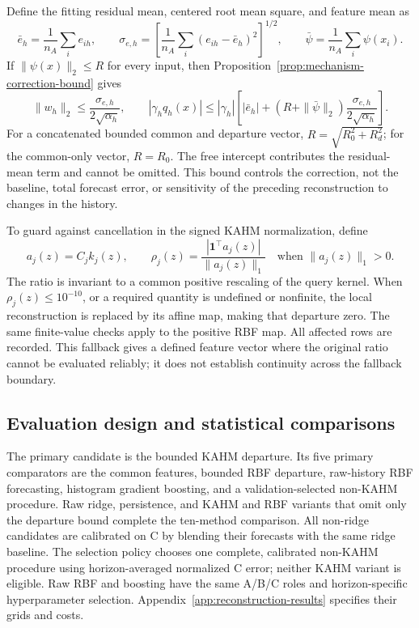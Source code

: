 Define the fitting residual mean, centered root mean square, and feature
mean as
\[
 \bar e_h=\frac1{n_A}\sum_i e_{ih},\qquad
 \sigma_{e,h}=\left[\frac1{n_A}\sum_i(e_{ih}-\bar e_h)^2\right]^{1/2},
 \qquad
 \bar\psi=\frac1{n_A}\sum_i\psi(x_i).
\]
If $\|\psi(x)\|_2\le R$ for every input, then
Proposition~\ref{prop:mechanism-correction-bound} gives
\begin{equation}
 \|w_h\|_2\le\frac{\sigma_{e,h}}{2\sqrt{\alpha_h}},\qquad
 |\gamma_h q_h(x)|\le |\gamma_h|\left[
 |\bar e_h|+(R+\|\bar\psi\|_2)
 \frac{\sigma_{e,h}}{2\sqrt{\alpha_h}}\right].
 \label{eq:mechanism-main-correction-bound}
\end{equation}
For a concatenated bounded common and departure vector,
$R=\sqrt{R_0^2+R_d^2}$; for the common-only vector, $R=R_0$.
The free intercept contributes the residual-mean term and cannot be
omitted. This bound controls the correction, not the baseline, total
forecast error, or sensitivity of the preceding reconstruction to changes
in the history.

To guard against cancellation in the signed KAHM normalization, define
\begin{equation}
 a_j(z)=C_j k_j(z),\qquad
 \rho_j(z)=\frac{|\mathbf1^\top a_j(z)|}{\|a_j(z)\|_1}
 \quad\text{when }\|a_j(z)\|_1>0.
 \label{eq:mechanism-relative-denominator}
\end{equation}
The ratio is invariant to a common positive rescaling of the query kernel.
When $\rho_j(z)\le10^{-10}$, or a required quantity is undefined or
nonfinite, the local reconstruction is replaced by its affine map, making
that departure zero. The same finite-value checks apply to the positive
RBF map. All affected rows are recorded. This fallback gives a defined
feature vector where the original ratio cannot be evaluated reliably;
it does not establish continuity across the fallback boundary.

\subsection{Evaluation design and statistical comparisons}

The primary candidate is the bounded KAHM departure. Its five primary
comparators are the common features, bounded RBF departure, raw-history
RBF forecasting, histogram gradient boosting, and a validation-selected
non-KAHM procedure. Raw ridge, persistence, and KAHM and RBF variants that
omit only the departure bound complete the ten-method comparison.
All non-ridge candidates are calibrated on C by blending their forecasts
with the same ridge baseline. The selection policy chooses one complete,
calibrated non-KAHM procedure using horizon-averaged normalized C error;
neither KAHM variant is eligible. Raw RBF and boosting have the same
A/B/C roles and horizon-specific hyperparameter selection.
Appendix~\ref{app:reconstruction-results} specifies their grids and costs.

